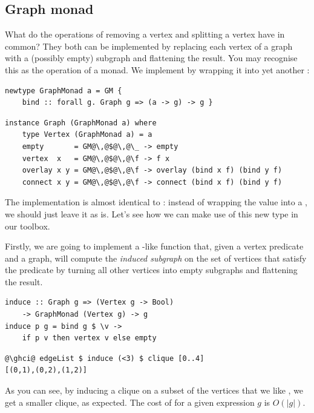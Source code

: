 \subsection{Graph monad}\label{sub-monad}

What do the operations of removing a vertex and splitting a vertex have in common?
They both can be implemented by replacing each vertex of a graph with a (possibly empty)
subgraph and flattening the result. You may recognise this as the  operation
of a monad. We implement  by wrapping it into yet another :

\begin{verbatim}
newtype GraphMonad a = GM {
    bind :: forall g. Graph g => (a -> g) -> g }
\end{verbatim}
\vspace{1mm}
\begin{verbatim}
instance Graph (GraphMonad a) where
    type Vertex (GraphMonad a) = a
    empty       = GM@\,@$@\,@\_ -> empty
    vertex  x   = GM@\,@$@\,@\f -> f x
    overlay x y = GM@\,@$@\,@\f -> overlay (bind x f) (bind y f)
    connect x y = GM@\,@$@\,@\f -> connect (bind x f) (bind y f)
\end{verbatim}

The implementation is almost identical to : instead of
wrapping the value  into a , we should just leave it as is.
Let's see how we can make use of this new type in our toolbox.

Firstly, we are going to implement a -like function 
that, given a vertex predicate and a graph, will compute the \emph{induced subgraph}
on the set of vertices that satisfy the predicate by turning all other
vertices into empty subgraphs and flattening the result.

\begin{verbatim}
induce :: Graph g => (Vertex g -> Bool)
    -> GraphMonad (Vertex g) -> g
induce p g = bind g $ \v ->
    if p v then vertex v else empty
\end{verbatim}
\vspace{1mm}
\begin{verbatim}
@\ghci@ edgeList $ induce (<3) $ clique [0..4]
[(0,1),(0,2),(1,2)]
\end{verbatim}

\noindent
As you can see, by inducing a clique on a subset of the vertices
that we like , we get a smaller clique, as expected.
The cost of  for a given expression $g$ is $O(|g|)$.

